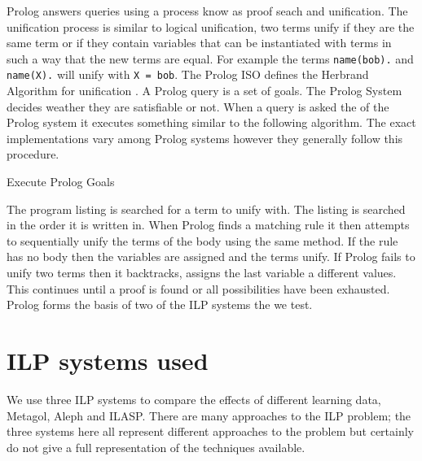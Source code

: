 Prolog answers queries using a process know as proof seach and unification. The unification process is similar to logical unification, two terms unify if they are the same term or if they contain variables that can be instantiated with terms in such a way that the new terms are equal. For example the terms \texttt{name(bob).} and \texttt{name(X).} will unify with \texttt{X = bob}. The Prolog ISO defines the Herbrand Algorithm for unification \cite{PrologISO}. A Prolog query is a set of goals. The Prolog System decides weather they are satisfiable or not. When a query is asked the of the Prolog system it executes something similar to the following algorithm. The exact implementations vary among Prolog systems however they generally follow this procedure.
\begin{algorithm}
	\caption{Execute Prolog Goals}
\end{algorithm}

The program listing is searched for a term to unify with. The listing is searched in the order it is written in. When Prolog finds a matching rule it then attempts to sequentially unify the terms of the body using the same method. If the rule has no body then the variables are assigned and the terms unify. If Prolog fails to unify two terms then it backtracks, assigns the last variable a different values. This continues until a proof is found or all possibilities have been exhausted\cite{Bratko}. Prolog forms the basis of two of the ILP systems the we test.

\section{ILP systems used}
We use three ILP systems to compare the effects of different learning data, Metagol, Aleph and ILASP. There are many approaches to the ILP problem\cite{Svetla/ILPOverview,Cropper/NewIdeas}; the three systems here all represent different approaches to the problem but certainly do not give a full representation of the techniques available.
